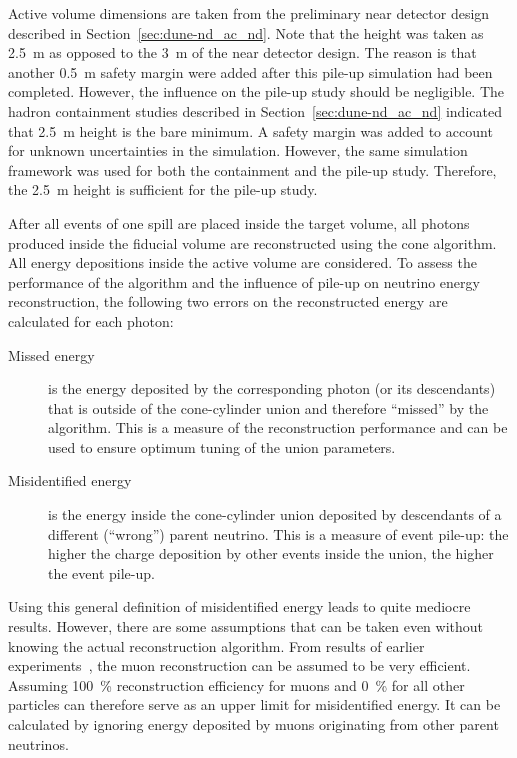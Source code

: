 Active volume dimensions are taken from the preliminary \dune{} near detector design described in Section~\ref{sec:dune-nd_ac_nd}.
Note that the height was taken as \SI{2.5}{\metre} as opposed to the \SI{3}{\metre} of the near detector design.
The reason is that another \SI{0.5}{\metre} safety margin were added after this pile-up simulation had been completed.
However, the influence on the pile-up study should be negligible.
The hadron containment studies described in Section~\ref{sec:dune-nd_ac_nd} indicated that \SI{2.5}{\metre} height is the bare minimum.
A safety margin was added to account for unknown uncertainties in the simulation.
However, the same simulation framework was used for both the containment and the pile-up study.
Therefore, the \SI{2.5}{\metre} height is sufficient for the pile-up study.

After all events of one spill are placed inside the target volume, all \Pgpz photons produced inside the fiducial volume are reconstructed using the cone algorithm.
All energy depositions inside the active volume are considered.
To assess the performance of the algorithm and the influence of pile-up on neutrino energy reconstruction, the following two errors on the reconstructed energy are calculated for each \Pgpz photon:
\begin{description}
	\item[Missed energy] is the energy deposited by the corresponding \Pgpz photon (or its descendants) that is outside of the cone-cylinder union and therefore ``missed'' by the algorithm.
		This is a measure of the reconstruction performance and can be used to ensure optimum tuning of the union parameters.
	\item[Misidentified energy] is the energy inside the cone-cylinder union deposited by descendants of a different (``wrong'') parent neutrino.
		This is a measure of event pile-up: the higher the charge deposition by other events inside the union, the higher the event pile-up.
\end{description}
Using this general definition of misidentified energy leads to quite mediocre results.
However, there are some assumptions that can be taken even without knowing the actual reconstruction algorithm.
From results of earlier experiments~\cite{pandora}, the muon reconstruction can be assumed to be very efficient.
Assuming \SI{100}{\percent} reconstruction efficiency for muons and \SI{0}{\percent} for all other particles can therefore serve as an upper limit for misidentified energy.
It can be calculated by ignoring energy deposited by muons originating from other parent neutrinos.
